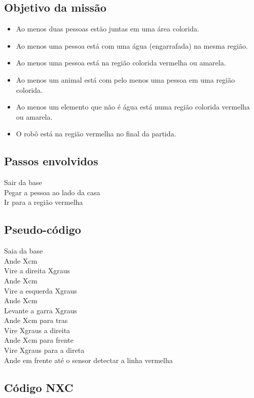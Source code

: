 \documentclass{article}
\begin{document}
	\subsection{Objetivo da missão}
		\begin{itemize}
			\item Ao menos duas pessoas estão juntas em uma área colorida.
			\item Ao menos uma pessoa está com uma água (engarrafada) na mesma região.
			\item Ao menos uma pessoa está na região colorida vermelha ou amarela.
			\item Ao menos um animal está com pelo menos uma pessoa em uma região colorida.
			\item Ao menos um elemento que não é água está numa região colorida vermelha ou amarela.
			\item O robô está na região vermelha no final da partida.
		\end{itemize}

	\subsection{Passos envolvidos}
		Sair da base\\
		Pegar a pessoa ao lado da casa\\
		Ir para a região vermelha\\

	\subsection{Pseudo-código}
		Saia da base\\
		Ande Xcm\\
		Vire a direita Xgraus\\
		Ande Xcm\\
		Vire a esquerda Xgraus\\
		Ande Xcm\\
		Levante a garra Xgraus\\
		Ande Xcm para tras\\
		Vire Xgraus a direita\\
		Ande Xcm para frente\\
		Vire Xgraus para a direta\\
		Ande em frente até o sensor detectar a linha vermelha\\

	\subsection{Código NXC}
		\inputminted[linenos, frame = single]{c}{../ZonaDeSeguranca.nxc}
\end{document}
